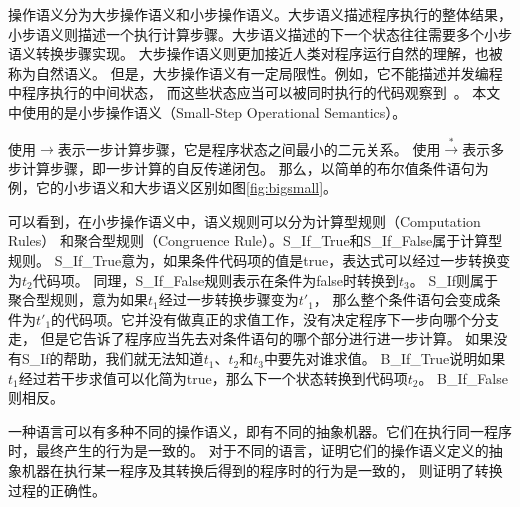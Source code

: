 操作语义分为大步操作语义和小步操作语义。大步语义描述程序执行的整体结果，
小步语义则描述一个执行计算步骤。大步语义描述的下一个状态往往需要多个小步语义转换步骤实现。
大步操作语义则更加接近人类对程序运行自然的理解，也被称为自然语义。
但是，大步操作语义有一定局限性。例如，它不能描述并发编程中程序执行的中间状态，
而这些状态应当可以被同时执行的代码观察到~\cite{pierce2010software}。
本文中使用的是小步操作语义（Small-Step Operational Semantics）。

使用$\rightarrow $表示一步计算步骤，它是程序状态之间最小的二元关系。
使用$\xrightarrow{*} $表示多步计算步骤，即一步计算的自反传递闭包。
那么，以简单的布尔值条件语句为例，它的小步语义和大步语义区别如图\ref{fig:bigsmall}。

可以看到，在小步操作语义中，语义规则可以分为计算型规则（Computation Rules）
和聚合型规则（Congruence Rule）。S\_If\_True和S\_If\_False属于计算型规则。
S\_If\_True意为，如果条件代码项的值是true，表达式可以经过一步转换变为$t_2$代码项。
同理，S\_If\_False规则表示在条件为false时转换到$t_3$。
S\_If则属于聚合型规则，意为如果$t_1$经过一步转换步骤变为$t'_1$，
那么整个条件语句会变成条件为$t'_1$的代码项。它并没有做真正的求值工作，没有决定程序下一步向哪个分支走，
但是它告诉了程序应当先去对条件语句的哪个部分进行进一步计算。
如果没有S\_If的帮助，我们就无法知道$t_1$、$t_2$和$t_3$中要先对谁求值。
B\_If\_True说明如果$t_1$经过若干步求值可以化简为true，那么下一个状态转换到代码项$t_2$。
B\_If\_False则相反。

一种语言可以有多种不同的操作语义，即有不同的抽象机器。它们在执行同一程序时，最终产生的行为是一致的。
对于不同的语言，证明它们的操作语义定义的抽象机器在执行某一程序及其转换后得到的程序时的行为是一致的，
则证明了转换过程的正确性。

